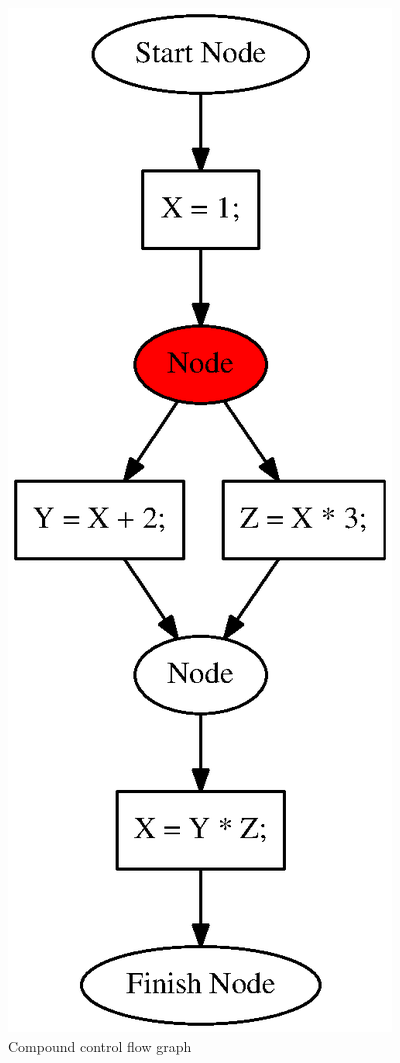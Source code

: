 \documentclass{sig-alternate-05-2015}
\begin{document}
\begin{figure}[h!]
    \begin{center}
        \includegraphics[scale=0.4]{Graphs/cfg_example.eps}
    \end{center}
    \caption{Compound control flow graph}
    \label{cfg_example}
\end{figure} 
\end{document}
